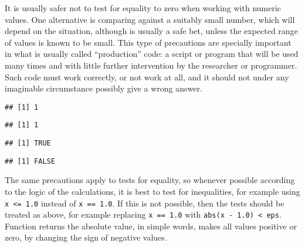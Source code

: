 \documentclass[paper=a4,10pt,div=17,headsepline,BCOR=12mm,twoside,open=right]{scrbook}\usepackage{knitr}
\begin{document}
It is usually safer not to test for equality to zero when working with numeric values. One alternative is comparing against a suitably small number, which will depend on the situation, although  is usually a safe bet, unless the expected range of values is known to be small. This type of precautions are specially important in what is usually called ``production'' code: a script or program that will be used many times and with little further intervention by the researcher or programmer. Such code must work correctly, or not work at all, and it should not under any imaginable circumstance possibly give a wrong answer.

\begin{knitrout}\footnotesize
{}\color{fgcolor}\begin{kframe}
\begin{alltt}
 \hlkwb{<-} \hlopt{$}
\hlstd{(}\hlopt{-}\hlstd{)}
\end{alltt}
\begin{verbatim}
## [1] 1
\end{verbatim}
\begin{alltt}
\hlstd{(}\hlstd{)}
\end{alltt}
\begin{verbatim}
## [1] 1
\end{verbatim}
\begin{alltt}
 \hlkwb{<-} 
 \hlopt{<}  \hlopt{*} 
\end{alltt}
\begin{verbatim}
## [1] TRUE
\end{verbatim}
\begin{alltt}
 \hlopt{<} 
\end{alltt}
\begin{verbatim}
## [1] FALSE
\end{verbatim}
\end{kframe}
\end{knitrout}

The same precautions apply to tests for equality, so whenever possible according to the logic of the calculations, it is best to test for inequalities, for example using \verb|x <= 1.0| instead of \verb|x == 1.0|. If this is not possible, then the tests should be treated as above, for example replacing \verb|x == 1.0| with \verb|abs(x - 1.0) < eps|. Function  returns the absolute value, in simple words, makes all values positive or zero, by changing the sign of negative values.
\end{document}
